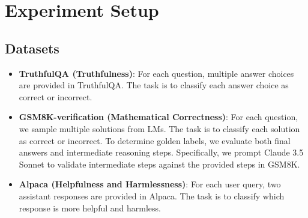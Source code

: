 \documentclass{article}
\begin{document}
\section{Experiment Setup}

\subsection{Datasets}

\begin{itemize}[leftmargin=*, topsep=0pt, itemsep=0pt]
    \item \textbf{TruthfulQA (Truthfulness)}: For each question, multiple answer choices are provided in TruthfulQA. The task is to classify each answer choice as correct or incorrect.
    \item \textbf{GSM8K-verification (Mathematical Correctness)}: For each question, we sample multiple solutions from LMs. The task is to classify each solution as correct or incorrect. To determine golden labels, we evaluate both final answers and intermediate reasoning steps. Specifically, we prompt Claude 3.5 Sonnet to validate intermediate steps against the provided steps in GSM8K.
    \item \textbf{Alpaca (Helpfulness and Harmlessness)}: For each user query, two assistant responses are provided in Alpaca. The task is to classify which response is more helpful and harmless.
\end{itemize}
\end{document}
